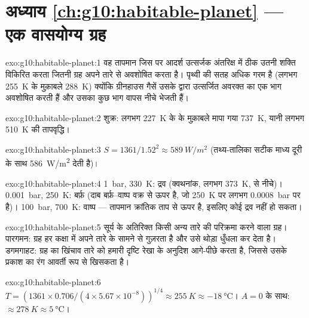 \section*{अध्याय \ref{ch:g10:habitable-planet} --- एक वासयोग्य ग्रह}

\begin{solution}{exo:g10:habitable-planet:1}
वह तापमान जिस पर आदर्श उत्सर्जक अंतरिक्ष में ठीक उतनी शक्ति विकिरित करता जितनी ग्रह
अपने तारे से अवशोषित करता है। पृथ्वी की सतह अधिक गरम है
(लगभग \qty{255}{K} के मुक़ाबले \qty{288}{K}) क्योंकि ग्रीनहाउस गैसें उसके द्वारा
उत्सर्जित अवरक्त का एक भाग अवशोषित करती हैं और उसका कुछ भाग वापस नीचे भेजती हैं।
\end{solution}

\begin{solution}{exo:g10:habitable-planet:2}
शुक्र: लगभग \qty{227}{K} के  के मुक़ाबले मापा गया \qty{737}{K},
यानी लगभग \qty{510}{K} की तापवृद्धि।
\end{solution}

\begin{solution}{exo:g10:habitable-planet:3}
$S = 1361/1.52^2 \approx \qty{589}{W/m^2}$ (तथ्य-तालिका सटीक माध्य दूरी के साथ
\qty{586}{W/m^2} देती है)।
\end{solution}

\begin{solution}{exo:g10:habitable-planet:4}
\qty{1}{bar}, \qty{330}{K}: द्रव (क्वथनांक, लगभग \qty{373}{K}, से नीचे)।
\qty{0.001}{bar}, \qty{250}{K}: बर्फ़ (दाब बर्फ़--वाष्प वक्र से ऊपर है, जो
\qty{250}{K} पर लगभग \qty{0.0008}{bar} पर है)।
\qty{100}{bar}, \qty{700}{K}: वाष्प --- तापमान क्रांतिक ताप से ऊपर है, इसलिए कोई
द्रव नहीं हो सकता।
\end{solution}

\begin{solution}{exo:g10:habitable-planet:5}
सूर्य के अतिरिक्त किसी अन्य तारे की परिक्रमा करने वाला ग्रह। पारगमन: ग्रह हर कक्षा में अपने
तारे के सामने से गुज़रता है और उसे थोड़ा धुँधला कर देता है। डगमगाहट: ग्रह का खिंचाव तारे
को हमारी दृष्टि रेखा के अनुदिश आगे-पीछे करता है, जिससे उसके प्रकाश का रंग आवर्ती रूप से
खिसकता है।
\end{solution}

\begin{solution}{exo:g10:habitable-planet:6}
$T = (1361 \times 0.706/(4 \times 5.67\times10^{-8}))^{1/4} \approx
\qty{255}{K} \approx \qty{-18}{\degreeCelsius}$। $A = 0$ के साथ:
$\approx \qty{278}{K} \approx \qty{5}{\degreeCelsius}$।
\end{solution}

